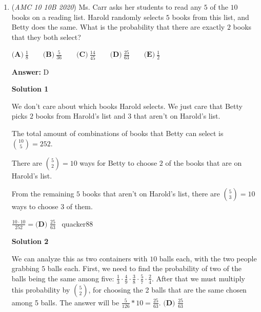 \begin{enumerate}
 - DBlack2021

 



\textbf{Solution 3}

The radius of the given $\frac{3}{4}$ - circle will end up being the slant height of the cone. Thus, the radius and height of the cone are legs of a right triangle with hypotenuse $4$. The volume of a cone is $\frac{1}{3}\pi r^{2}h$. Using this with the options, we can take out the $\pi$ and multiply the coefficient of the radical by $3$ to get $r^{2}h$. We can then use the $r$ and $h$ values to see that the only option that satisfies $r^2+h^2=4^2=16$ is $\boxed{\textbf{(C)}}$

 - ColtsFan10

 


	\item (\textit{AMC 10 10B 2020}) Ms. Carr asks her students to read any $5$ of the $10$ books on a reading list. Harold randomly selects $5$ books from this list, and Betty does the same. What is the probability that there are exactly $2$ books that they both select?


 $\textbf{(A)}\ \frac{1}{8} \qquad\textbf{(B)}\ \frac{5}{36} \qquad\textbf{(C)}\ \frac{14}{45} \qquad\textbf{(D)}\ \frac{25}{63} \qquad\textbf{(E)}\ \frac{1}{2}$

 \textbf{Answer: }D



\textbf{Solution 1}

We don't care about which books Harold selects. We just care that Betty picks $2$ books from Harold's list and $3$ that aren't on Harold's list.

 The total amount of combinations of books that Betty can select is $\binom{10}{5}=252$. 

 There are $\binom{5}{2}=10$ ways for Betty to choose $2$ of the books that are on Harold's list.

 From the remaining $5$ books that aren't on Harold's list, there are $\binom{5}{3}=10$ ways to choose $3$ of them.

 $\frac{10\cdot10}{252}=\boxed{\textbf{(D) }\frac{25}{63}}$ ~quacker88

 



\textbf{Solution 2}

We can analyze this as two containers with $10$ balls each, with the two people grabbing $5$ balls each. First, we need to find the probability of two of the balls being the same among five: $\frac{1}{3} \cdot \frac{4}{9} \cdot \frac{3}{8} \cdot \frac{5}{7} \cdot \frac{2}{4}$. After that we must multiply this probability by ${5 \choose 2}$, for choosing the 2 balls that are the same chosen among 5 balls. The answer will be $\frac{5}{126}*10 = \frac{25}{63}$. $\boxed{\textbf{(D) }\frac{25}{63}}$





\end{enumerate}
